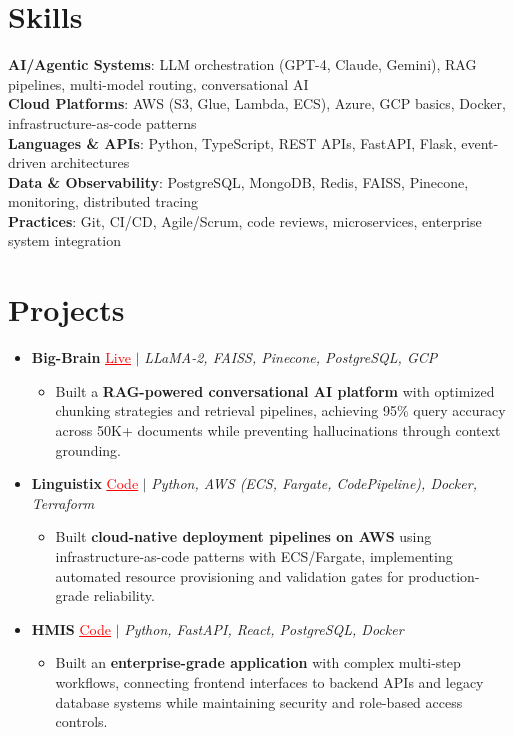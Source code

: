 \documentclass[letterpaper,10pt]{article}
\newcommand{\resumeItem}[1]{\item\small{{#1 \vspace{-2pt}}}}
\newcommand{\resumeProjectHeading}[1]{\item \small #1 \vspace{-2pt}}
\newcommand{\resumeSubHeadingListStart}{\begin{itemize}[leftmargin=0.0in, label={}]}
\newcommand{\resumeSubHeadingListEnd}{\end{itemize}}
\newcommand{\resumeProjItemListStart}{\begin{itemize}[leftmargin=0.15in,label=\textbullet,itemsep=0pt,topsep=0pt,parsep=0pt,partopsep=0pt]}
\newcommand{\resumeProjItemListEnd}{\end{itemize}\vspace{-4pt}}
\begin{document}
\section{Skills}
\begin{itemize}[leftmargin=0.15in, label={}]
\small{\item{
\textbf{AI/Agentic Systems}: LLM orchestration (GPT-4, Claude, Gemini), RAG pipelines, multi-model routing, conversational AI \\
\textbf{Cloud Platforms}: AWS (S3, Glue, Lambda, ECS), Azure, GCP basics, Docker, infrastructure-as-code patterns \\
\textbf{Languages \& APIs}: Python, TypeScript, REST APIs, FastAPI, Flask, event-driven architectures \\
\textbf{Data \& Observability}: PostgreSQL, MongoDB, Redis, FAISS, Pinecone, monitoring, distributed tracing \\
\textbf{Practices}: Git, CI/CD, Agile/Scrum, code reviews, microservices, enterprise system integration
}}
\end{itemize}
\vspace{-16pt}
\section{Projects}
\resumeSubHeadingListStart
\vspace{-2pt}
\resumeProjectHeading{\textbf{Big-Brain} {\href{https://big-brain-pied.vercel.app/}{\textcolor{red}{\underline{Live}}}} $|$ \emph{LLaMA-2, FAISS, Pinecone, PostgreSQL, GCP}}
\resumeProjItemListStart
\resumeItem{Built a \textbf{RAG-powered conversational AI platform} with optimized chunking strategies and retrieval pipelines, achieving 95\% query accuracy across 50K+ documents while preventing hallucinations through context grounding.}
\resumeProjItemListEnd
\vspace{3pt}
\resumeProjectHeading{\textbf{Linguistix} {\href{https://github.com/SAHAJ-BHADJA/Linguistix}{\textcolor{red}{\underline{Code}}}} $|$ \emph{Python, AWS (ECS, Fargate, CodePipeline), Docker, Terraform}}
\resumeProjItemListStart
\resumeItem{Built \textbf{cloud-native deployment pipelines on AWS} using infrastructure-as-code patterns with ECS/Fargate, implementing automated resource provisioning and validation gates for production-grade reliability.}
\resumeProjItemListEnd
\vspace{3pt}
\resumeProjectHeading{\textbf{HMIS} {\href{https://github.com/SAHAJ-BHADJA/HospitalManagementSystem}{\textcolor{red}{\underline{Code}}}} $|$ \emph{Python, FastAPI, React, PostgreSQL, Docker}}
\resumeProjItemListStart
\resumeItem{Built an \textbf{enterprise-grade application} with complex multi-step workflows, connecting frontend interfaces to backend APIs and legacy database systems while maintaining security and role-based access controls.}
\resumeProjItemListEnd
\resumeSubHeadingListEnd
\end{document}
